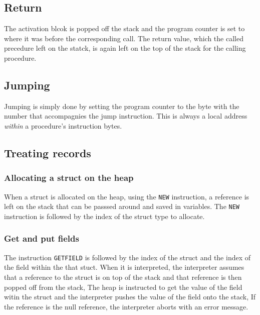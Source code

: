 \documentclass[11pt]{article}
\begin{document}
\subsection{Return}
\label{sec:org0ae8ade}

The activation blcok is popped off the stack and the program counter is set
to where it was before the corresponding call. The return value, which the
called precedure left on the statck, is again left on the top of the stack
for the calling procedure.


\subsection{Jumping}
\label{sec:org0860850}


Jumping is simply done by setting the program counter to the byte with the
number that accompagnies the jump instruction. This is always a local
address \emph{within} a procedure's instruction bytes.


\subsection{Treating records}
\label{sec:orgf7e13e2}
\subsubsection{Allocating a struct on the heap}
\label{sec:org3a5a0ce}

When a struct is allocated on the heap, using the \texttt{NEW} instruction, a
reference is left on the stack that can be passsed around and saved in
variables. The \texttt{NEW} instruction is followed by the index of the struct
type to allocate.


\subsubsection{Get and put fields}
\label{sec:org8c3be2f}


The instruction \texttt{GETFIELD} is followed by the index of the struct and the
index of the field within the that stuct. When it is interpreted, the
interpreter assumes that a reference to the struct is on top of the stack
and that reference is then popped off from the stack, The heap is
instructed to get the value of the field witin the struct and the
interpreter pushes the value of the field onto the stack, If the reference
is the null reference, the interpreter aborts with an error message.
\end{document}
